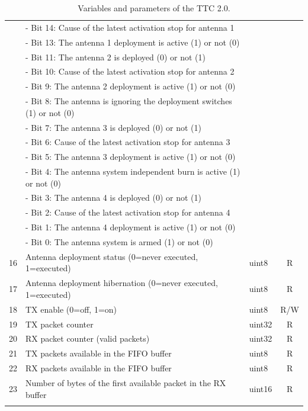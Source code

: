 \begin{longtable}[c]{cL{0.72\textwidth}lc}
        & - Bit 14: Cause of the latest activation stop for antenna 1       &        &   \\
        & - Bit 13: The antenna 1 deployment is active (1) or not (0)       &        &   \\
        & - Bit 11: The antenna 2 is deployed (0) or not (1)                &        &   \\
        & - Bit 10: Cause of the latest activation stop for antenna 2       &        &   \\
        & - Bit 9: The antenna 2 deployment is active (1) or not (0)        &        &   \\
        & - Bit 8: The antenna is ignoring the deployment switches (1) or not (0) &  &   \\
        & - Bit 7: The antenna 3 is deployed (0) or not (1)                 &        &   \\
        & - Bit 6: Cause of the latest activation stop for antenna 3        &        &   \\
        & - Bit 5: The antenna 3 deployment is active (1) or not (0)        &        &   \\
        & - Bit 4: The antenna system independent burn is active (1) or not (0) &    &   \\
        & - Bit 3: The antenna 4 is deployed (0) or not (1)                 &        &   \\
        & - Bit 2: Cause of the latest activation stop for antenna 4        &        &   \\
        & - Bit 1: The antenna 4 deployment is active (1) or not (0)        &        &   \\
        & - Bit 0: The antenna system is armed (1) or not (0)               &        &   \\
    16  & Antenna deployment status (0=never executed, 1=executed)          & uint8  & R \\
    17  & Antenna deployment hibernation (0=never executed, 1=executed)     & uint8  & R \\
    18  & TX enable (0=off, 1=on)                                           & uint8  & R/W \\
    19  & TX packet counter                                                 & uint32 & R \\
    20  & RX packet counter (valid packets)                                 & uint32 & R \\
    21  & TX packets available in the FIFO buffer                           & uint8  & R \\
    22  & RX packets available in the FIFO buffer                           & uint8  & R \\
    23  & Number of bytes of the first available packet in the RX buffer    & uint16 & R \\
    \bottomrule[1.5pt]
    \caption{Variables and parameters of the TTC 2.0.}
    \label{tab:ttc2-variables}
\end{longtable}

